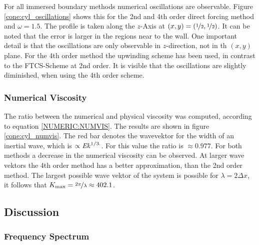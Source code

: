 For all immersed boundary methods numerical oscillations are observable.
Figure \ref{cone:cyl_oscillations} shows this for the 2nd and 4th order direct forcing method and $\omega=1.5$.
The profile is taken along the $z$-Axis at $(x,y)=(\nicefrac{1}{2},\nicefrac{1}{2})$.
It can be noted that the error is larger in the regions near to the wall.
One important detail is that the oscillations are only observable in $z$-direction, not
in th $(x,y)$ plane.
For the 4th order method the upwinding scheme has been used, in contrast to the FTCS-Scheme at 2nd order.
It is visible that the oscillations are slightly diminished, when using the 4th order scheme.

\subsubsection{Numerical Viscosity}

The ratio between the numerical and physical viscosity was computed, according to equation \ref{NUMERIC:NUMVIS}.
The results are shown in figure \ref{cone:cyl_numvis}.
The red bar denotes the wavevektor for the width of an inertial wave, which is $\propto \mbox{\textit{Ek}}^{1/3.}$.
For this value the ratio is $\approx{0.977}$.
For both methods a decrease in the numerical viscosity can  be observed.
At larger wave vektors the 4th order method has a better approximation, than the 2nd order method.
The largest possible wave vektor of the  system is possible for $\lambda = 2\Delta x$,
it follows that $K_{\text{max}} = \nicefrac{2\pi}{\lambda} \approx 402.1$.
\clearpage

\subsection{Discussion}

\subsubsection{Frequency Spectrum}

